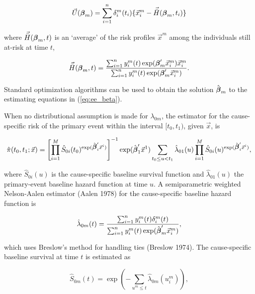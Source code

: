 \documentclass[11pt]{article}
\newcommand{\bbeta}{\mbox{\boldmath$\beta$}}
\begin{document}
\begin{equation}
\vec{U}(\bbeta_m) = \sum_{i=1}^n \delta^m_i (t_i) \lbrace\vec{x}^m_i - \vec{\bar{H}}(\bbeta_m, t_i) \rbrace
\label{eq:ee_beta}
\end{equation}

\noindent  where $\vec{\bar{H}}(\bbeta_m, t)$ is an `average' of the risk profiles $\vec{x}^m$  among the individuals still at-risk at time $t$, 

\begin{equation}
\vec{\bar{H}}(\bbeta_m,t) = \frac{\sum_{i=1}^n  y^m_i(t) \exp ( \bbeta_m' \vec{x}^m_i ) \vec{x}^m_i}{\sum_{i=1}^n  y^m_i(t) \exp ( \bbeta_m' \vec{x}^m_i ) }.
\label{eq:Hbar}
\end{equation}

\noindent  Standard optimization algorithms can be used to obtain the solution $\hat{\bbeta}_m$ to the estimating equations in (\ref{eq:ee_beta}).

When no distributional assumption is made for $\lambda_{0m}$, the estimator for the cause-specific risk of the primary event within the interval $[t_0, t_1)$, given $\vec{x}$, is

\begin{equation}
\hat{\pi}(t_0,t_1;\vec{x}) = \left[ \prod_{i=1}^M \hat{S}_{0i}(t_0)^{\exp (\hat{\bbeta}_i'\vec{x}^i )}  \right]^{-1}  \exp (\hat{\bbeta}_1'\vec{x}^1 )\sum_{t_0 \leq u < t_1} \hat{\lambda}_{01}(u) \prod_{i=1}^M \hat{S}_{0i}(u)^{\exp(\hat{\bbeta}_i'\vec{x}^i )},
\label{eq:est_abs_risk}
\end{equation}

\noindent where $\hat{S}_{0i}(u)$ is the cause-specific baseline survival function and $\hat{\lambda}_{01}(u)$ the primary-event baseline hazard function at time $u$. A semiparametric weighted Nelson-Aalen estimator (Aalen 1978) for the cause-specific baseline hazard function is 

\begin{equation}
\hat{\lambda}_{0m}(t) = \frac{\sum_{i=1}^n y^m_i(t) \delta^m_i(t)}{\sum_{i=1}^n  y^m_i(t) \exp ( \hat{\bbeta}_m' \vec{x}^m_i )},
\label{eq:hazard_est}
\end{equation}

\noindent which uses Breslow's method for handling ties (Breslow 1974). The cause-specific baseline survival at time $t$ is estimated as

\begin{equation}
\hat{S}_{0m}(t) = \exp (- \sum_{u^m \leq t} \hat{\lambda}_{0m} (u^m_{i}) ),
\label{eq:surv_base}
\end{equation}
\end{document}
